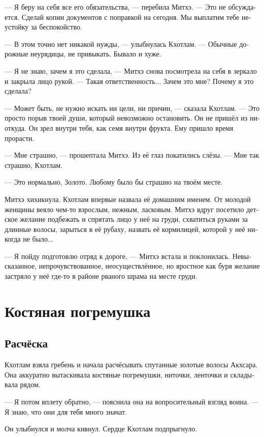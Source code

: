 \documentclass[a4paper,12pt,fleqn]{book}\usepackage{cooltooltips}\usepackage{polyglossia}\setdefaultlanguage{russian}\setotherlanguage{english}\defaultfontfeatures{Ligatures=TeX,Mapping=tex-text} \usepackage{xcolor}\definecolor{lightgray}{HTML}{bbbbbb}\color{lightgray}\newcommand{\ml}[3]{\textenglish{\textcolor{black}{#3}}}
\begin{document}
--- Я беру на себя все его обязательства, --- перебила Митхэ.
--- Это не обсуждается.
Сделай копии документов с поправкой на сегодня.
Мы выплатим тебе неустойку за беспокойство.

--- В этом точно нет никакой нужды, --- улыбнулась Кхотлам.
--- Обычные дорожные неурядицы, не привыкать.
Бывало и хуже.

--- Я не знаю, зачем я это сделала, --- Митхэ снова посмотрела на себя в зеркало и закрыла лицо рукой.
--- Такая ответственность...
Зачем это мне?
Почему я это сделала?

--- Может быть, не нужно искать ни цели, ни причин, --- сказала Кхотлам.
--- Это просто порыв твоей души, который невозможно остановить.
Он не пришёл из ниоткуда.
Он зрел внутри тебя, как семя внутри фрукта.
Ему пришло время прорасти.

--- Мне страшно, --- прошептала Митхэ.
Из её глаз покатились слёзы.
--- Мне так страшно, Кхотлам.

--- Это нормально, Золото.
Любому было бы страшно на твоём месте.

Митхэ хихикнула.
Кхотлам впервые назвала её домашним именем.
От молодой женщины веяло чем-то взрослым, нежным, ласковым.
Митхэ вдруг посетило детское желание подбежать и спрятать лицо у неё на груди, схватиться руками за длинные волосы, зарыться в её рубаху, назвать её кормилицей, которой у неё никогда не было...

--- Я пойду подготовлю отряд к дороге, --- Митхэ встала и поклонилась.
Невысказанное, непрочувствованное, неосуществлённое, но яростное как буря желание застряло у неё где-то в районе рваного шрама на месте груди.

\chapter{Костяная погремушка}

\section{Расчёска}

Кхотлам взяла гребень и начала расчёсывать спутанные золотые волосы Акхсара.
Она аккуратно вытаскивала костяные погремушки, ниточки, ленточки и складывала рядом.

--- Я потом вплету обратно, --- пояснила она на вопросительный взгляд воина.
--- Я знаю, что они для тебя много значат.

Он улыбнулся и молча кивнул.
Сердце Кхотлам подпрыгнуло.
\end{document}
